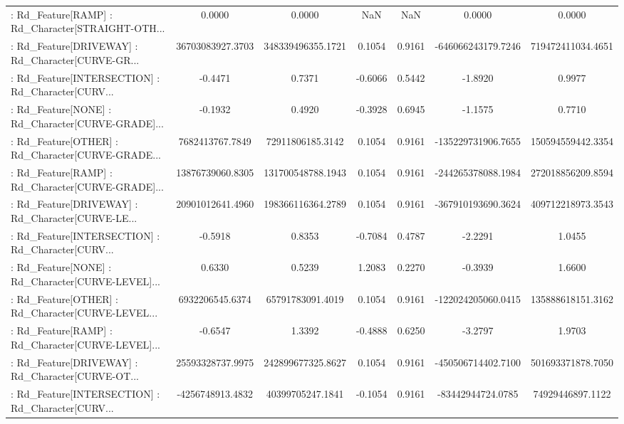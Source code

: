 \begin{longtable}{p{4cm}cccccc}
 : Rd\_Feature[RAMP] : Rd\_Character[STRAIGHT-OTH... &            0.0000 &            0.0000 &     NaN &          NaN &             0.0000 &            0.0000 \\
 : Rd\_Feature[DRIVEWAY] : Rd\_Character[CURVE-GR... &  36703083927.3703 & 348339496355.1721 &  0.1054 &       0.9161 & -646066243179.7246 & 719472411034.4651 \\
 : Rd\_Feature[INTERSECTION] : Rd\_Character[CURV... &           -0.4471 &            0.7371 & -0.6066 &       0.5442 &            -1.8920 &            0.9977 \\
 : Rd\_Feature[NONE] : Rd\_Character[CURVE-GRADE]... &           -0.1932 &            0.4920 & -0.3928 &       0.6945 &            -1.1575 &            0.7710 \\
 : Rd\_Feature[OTHER] : Rd\_Character[CURVE-GRADE... &   7682413767.7849 &  72911806185.3142 &  0.1054 &       0.9161 & -135229731906.7655 & 150594559442.3354 \\
 : Rd\_Feature[RAMP] : Rd\_Character[CURVE-GRADE]... &  13876739060.8305 & 131700548788.1943 &  0.1054 &       0.9161 & -244265378088.1984 & 272018856209.8594 \\
 : Rd\_Feature[DRIVEWAY] : Rd\_Character[CURVE-LE... &  20901012641.4960 & 198366116364.2789 &  0.1054 &       0.9161 & -367910193690.3624 & 409712218973.3543 \\
 : Rd\_Feature[INTERSECTION] : Rd\_Character[CURV... &           -0.5918 &            0.8353 & -0.7084 &       0.4787 &            -2.2291 &            1.0455 \\
 : Rd\_Feature[NONE] : Rd\_Character[CURVE-LEVEL]... &            0.6330 &            0.5239 &  1.2083 &       0.2270 &            -0.3939 &            1.6600 \\
 : Rd\_Feature[OTHER] : Rd\_Character[CURVE-LEVEL... &   6932206545.6374 &  65791783091.4019 &  0.1054 &       0.9161 & -122024205060.0415 & 135888618151.3162 \\
 : Rd\_Feature[RAMP] : Rd\_Character[CURVE-LEVEL]... &           -0.6547 &            1.3392 & -0.4888 &       0.6250 &            -3.2797 &            1.9703 \\
 : Rd\_Feature[DRIVEWAY] : Rd\_Character[CURVE-OT... &  25593328737.9975 & 242899677325.8627 &  0.1054 &       0.9161 & -450506714402.7100 & 501693371878.7050 \\
 : Rd\_Feature[INTERSECTION] : Rd\_Character[CURV... &  -4256748913.4832 &  40399705247.1841 & -0.1054 &       0.9161 &  -83442944724.0785 &  74929446897.1122 \\

\end{longtable}
